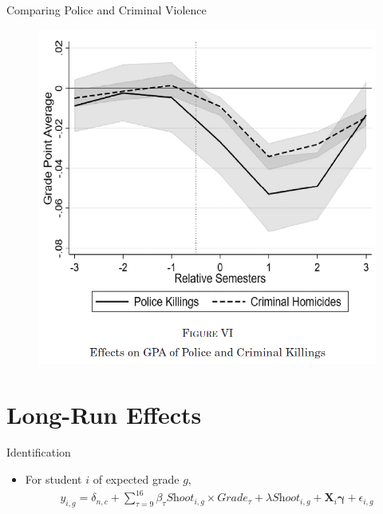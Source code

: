 \documentclass[dvipdfmx]{beamer}
\begin{document}
\begin{frame}{Comparing Police and Criminal Violence}
  
\end{frame}

\begin{frame}{}
  \begin{figure}
    \centering
    \includegraphics[scale = .55]{fig_tab/os20220113/F6}
  \end{figure}
\end{frame}

\section{Long-Run Effects}
\frame{\sectionpage}

\begin{frame}{Identification}
  \begin{itemize}
    \item For student $i$ of expected grade $g$,
    \begin{align*}
      y_{i, g} = \delta_{n, c} + \sum_{\tau = 9}^{16} \beta_{\tau} \textit{Shoot}_{i, g} \times \textit{Grade}_{\tau} + \lambda \textit{Shoot}_{i, g} + \mathbf{X}_i \boldsymbol{\gamma} + \epsilon_{i, g}
    \end{align*}
  \end{itemize}
\end{frame}
\end{document}

